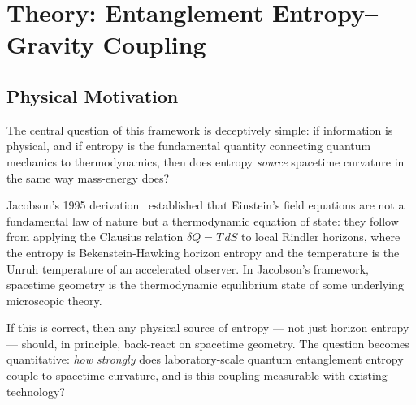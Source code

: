 %

\section{Theory: Entanglement Entropy--Gravity Coupling}
\label{sec:theory}

\subsection{Physical Motivation}
\label{subsec:motivation}

The central question of this framework is deceptively simple: if information
is physical, and if entropy is the fundamental quantity connecting quantum
mechanics to thermodynamics, then does entropy \emph{source} spacetime
curvature in the same way mass-energy does?

Jacobson's 1995 derivation~\cite{jacobson1995} established that Einstein's
field equations are not a fundamental law of nature but a thermodynamic
equation of state: they follow from applying the Clausius relation
$\delta Q = T\,dS$ to local Rindler horizons, where the entropy is
Bekenstein-Hawking horizon entropy and the temperature is the Unruh
temperature of an accelerated observer. In Jacobson's framework, spacetime
geometry is the thermodynamic equilibrium state of some underlying
microscopic theory.

If this is correct, then any physical source of entropy --- not just
horizon entropy --- should, in principle, back-react on spacetime geometry.
The question becomes quantitative: \emph{how strongly} does laboratory-scale
quantum entanglement entropy couple to spacetime curvature, and is this
coupling measurable with existing technology?

